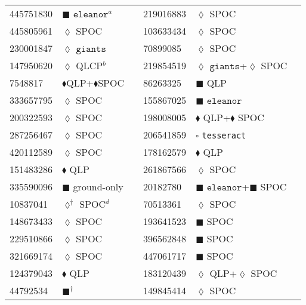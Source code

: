 \begin{longtable}{llrllr}
445751830 & $\blacksquare$ $\texttt{eleanor}^a$ & \cite{TIC_445751830} & 219016883 & $\lozenge$ SPOC & \cite{TIC_219016883} \\
445805961 & $\lozenge$ SPOC & \cite{TIC_445805961} & 103633434 &$\lozenge$ SPOC  & \cite{TIC_103633434} \\
230001847 & $\lozenge$ $\texttt{giants}$ & \cite{TIC_348835438} & 70899085 & $\lozenge$ SPOC & \cite{TIC_70899085} \\
147950620 & $\lozenge$ QLCP$^b$ & \cite{TIC_147950620} & 219854519 & $\lozenge$ $\texttt{giants}$+$\lozenge$ SPOC & \cite{TIC_219854519} \\
7548817 & $\blacklozenge$QLP+$\blacklozenge$SPOC & \cite{TIC_156648452} & 86263325 & $\blacksquare$ QLP & \cite{TIC_86263325} \\
333657795 & $\lozenge$ SPOC & \cite{TIC_333657795} & 155867025 & $\blacksquare$ $\texttt{eleanor}$ & \cite{TIC_155867025} \\
200322593 & $\lozenge$ SPOC & \cite{TIC_200322593} & 198008005 & $\blacklozenge$ QLP+$\blacklozenge$ SPOC & \cite{TIC_198008005} \\
287256467 & $\lozenge$ SPOC & \cite{TIC_287256467} & 206541859 & $\square$ \texttt{tesseract} & \cite{TIC_157698565} \\
420112589 & $\lozenge$ SPOC & \cite{TIC_420112589} & 178162579 & $\blacklozenge$ QLP & \cite{TIC_156648452} \\
151483286 & $\blacklozenge$ QLP & \cite{TIC_156648452} & 261867566 & $\lozenge$ SPOC & \cite{TIC_261867566} \\
335590096 & $\blacksquare$ ground-only & \cite{TIC_335590096} & 20182780 & $\blacksquare$ $\texttt{eleanor}$+$\blacksquare$ SPOC & \cite{TIC_20182780} \\
10837041 & $\lozenge^\dagger$ SPOC$^d$ & \cite{TIC_10837041} & 70513361 & $\lozenge$ SPOC & \cite{TIC_70513361} \\
148673433 & $\lozenge$ SPOC & \cite{TIC_428699140} & 193641523 & $\blacksquare$ SPOC & \cite{TIC_193641523} \\
229510866 & $\lozenge$ SPOC & \cite{TIC_376637093} & 396562848 & $\blacksquare$ SPOC & \cite{TIC_396562848} \\
321669174 & $\lozenge$ SPOC & \cite{TIC_126606859} & 447061717 & $\blacksquare$ SPOC & \cite{TIC_447061717} \\
124379043 & $\blacklozenge$ QLP & \cite{TIC_156648452} & 183120439 & $\lozenge$ QLP+$\lozenge$ SPOC & \cite{TIC_140691463} \\
44792534 & $\blacksquare^\dagger$ & \cite{TIC_44792534} & 149845414 & $\lozenge$ SPOC & \cite{TIC_219016883} \\

\end{longtable}

